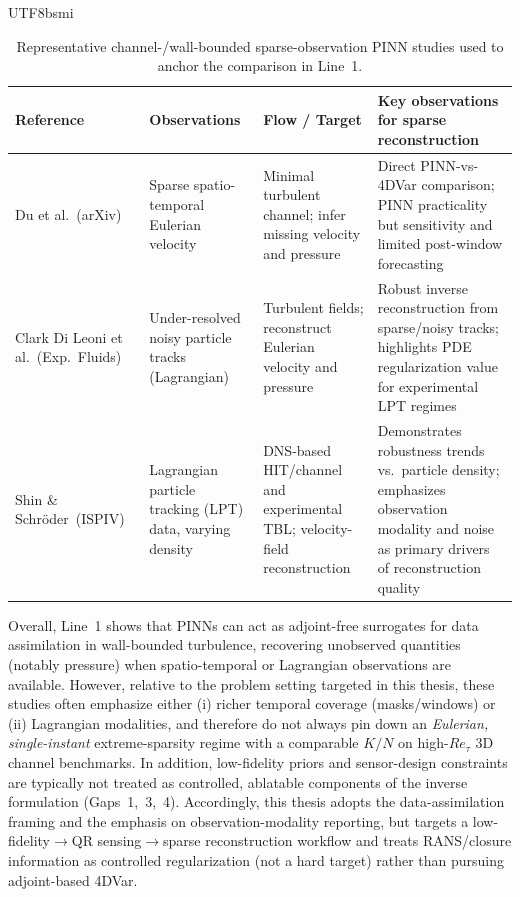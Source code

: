 \documentclass[master]{NTHUthesis}
\begin{document}
\begin{CJK*}{UTF8}{bsmi}
\begin{table}[!htbp]
    \centering
    \caption{Representative channel-/wall-bounded sparse-observation PINN studies used to anchor the comparison in Line~1.}
    \label{tab:pinns_turbulence}
    \footnotesize
    \begin{tabularx}{\textwidth}{
        >{\raggedright\arraybackslash}p{3.4cm}
        >{\raggedright\arraybackslash}p{3.4cm}
        >{\raggedright\arraybackslash}p{3.0cm}
        X
    }
    \toprule
    \textbf{Reference} & \textbf{Observations} & \textbf{Flow / Target} & \textbf{Key observations for sparse reconstruction} \\
    \midrule
    Du et al.\ (arXiv)~\cite{du2022stateestimationminimalturbulent} & Sparse spatio-temporal Eulerian velocity & Minimal turbulent channel; infer missing velocity and pressure & Direct PINN-vs-4DVar comparison; PINN practicality but sensitivity and limited post-window forecasting \\
    Clark Di Leoni et al.\ (Exp.\ Fluids)~\cite{Clark_Di_Leoni_2023} & Under-resolved noisy particle tracks (Lagrangian) & Turbulent fields; reconstruct Eulerian velocity and pressure & Robust inverse reconstruction from sparse/noisy tracks; highlights PDE regularization value for experimental LPT regimes \\
    Shin \& Schr{\"o}der\ (ISPIV)~\cite{shin2025robust} & Lagrangian particle tracking (LPT) data, varying density & DNS-based HIT/channel and experimental TBL; velocity-field reconstruction & Demonstrates robustness trends vs.\ particle density; emphasizes observation modality and noise as primary drivers of reconstruction quality \\
	    \bottomrule
	    \end{tabularx}
\end{table}
\FloatBarrier

Overall, Line~1 shows that PINNs can act as adjoint-free surrogates for data assimilation in wall-bounded turbulence, recovering unobserved quantities (notably pressure) when spatio-temporal or Lagrangian observations are available. However, relative to the problem setting targeted in this thesis, these studies often emphasize either (i) richer temporal coverage (masks/windows) or (ii) Lagrangian modalities, and therefore do not always pin down an \emph{Eulerian, single-instant} extreme-sparsity regime with a comparable $K/N$ on high-$Re_\tau$ 3D channel benchmarks. In addition, low-fidelity priors and sensor-design constraints are typically not treated as controlled, ablatable components of the inverse formulation (Gaps~1,~3,~4). Accordingly, this thesis adopts the data-assimilation framing and the emphasis on observation-modality reporting, but targets a low-fidelity$\rightarrow$QR sensing$\rightarrow$sparse reconstruction workflow and treats RANS/closure information as controlled regularization (not a hard target) rather than pursuing adjoint-based 4DVar.


\end{CJK*}
\end{document}
